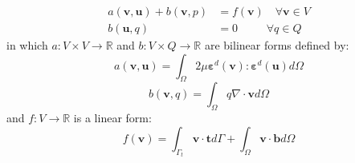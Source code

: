 \begin{equation}\label{weak}
    \begin{split}
        a(\boldsymbol v, \boldsymbol u) + b(\boldsymbol v, p) &= f(\boldsymbol v)  \quad \forall \boldsymbol v \in V \\
        b(\boldsymbol u,q) &= 0 \qquad \;\; \forall q \in Q
    \end{split}
\end{equation}
in which $a: V \times V \rightarrow \mathbb R$ and $b: V \times Q \rightarrow \mathbb R$ are bilinear forms defined by:
\begin{equation}
a(\boldsymbol v, \boldsymbol u) = \int_{\Omega} 2\mu \boldsymbol \varepsilon^d(\boldsymbol v) : \boldsymbol \varepsilon^d(\boldsymbol u) d\Omega
\end{equation}
\begin{equation}
b(\boldsymbol v, q) = \int_{\Omega} q \nabla \cdot \boldsymbol v d\Omega
\end{equation}
and $f: V \rightarrow \mathbb R$ is a linear form:
\begin{equation}
f(\boldsymbol v) = \int_{\Gamma_t} \boldsymbol v \cdot \boldsymbol t d\Gamma + \int_{\Omega} \boldsymbol v \cdot \boldsymbol b d\Omega
\end{equation}

